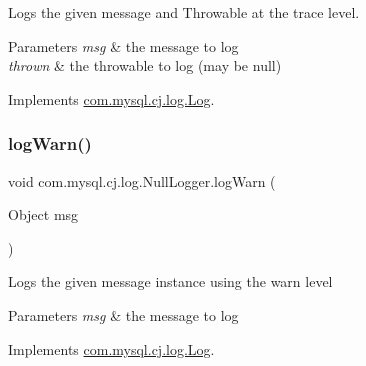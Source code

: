 Logs the given message and Throwable at the \textquotesingle{}trace\textquotesingle{} level.


\begin{DoxyParams}{Parameters}
{\em msg} & the message to log \\
\hline
{\em thrown} & the throwable to log (may be null) \\
\hline
\end{DoxyParams}


Implements \mbox{\hyperlink{interfacecom_1_1mysql_1_1cj_1_1log_1_1_log_aa93fa5550a3152afd64479adca676200}{com.\+mysql.\+cj.\+log.\+Log}}.

\mbox{\label{classcom_1_1mysql_1_1cj_1_1log_1_1_null_logger_aa9e190bc8cca0fb1c78bbc3e9d05cb26}} 
\subsubsection{\texorpdfstring{log\+Warn()}{logWarn()}\hspace{0.1cm}{\footnotesize\ttfamily [1/2]}}
{\footnotesize\ttfamily void com.\+mysql.\+cj.\+log.\+Null\+Logger.\+log\+Warn (\begin{DoxyParamCaption}\item[{Object}]{msg }\end{DoxyParamCaption})}

Logs the given message instance using the \textquotesingle{}warn\textquotesingle{} level


\begin{DoxyParams}{Parameters}
{\em msg} & the message to log \\
\hline
\end{DoxyParams}


Implements \mbox{\hyperlink{interfacecom_1_1mysql_1_1cj_1_1log_1_1_log_a3a30dcfb7f5790b79e9db64431107cfc}{com.\+mysql.\+cj.\+log.\+Log}}.

\mbox{\label{classcom_1_1mysql_1_1cj_1_1log_1_1_null_logger_a93b1146368f2a30e7b4c74c043c4c00e}} 
